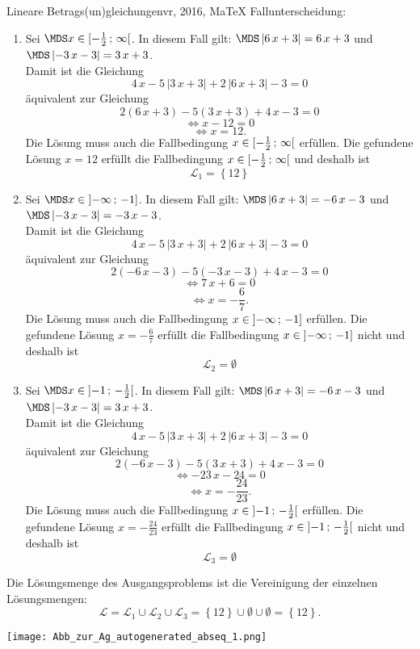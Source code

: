 \begin{MAufgabe}{Lineare Betrags(un)gleichungen}{vr, 2016, MaTeX}
 Fallunterscheidung: 

 \begin{enumerate} 
 \item Sei $ \MDS x\in[ - \frac{1}{2} \, \MIntvlSep \, \infty\MoIr $. 
 In diesem Fall gilt: 
  $ \MDS \left| 6\, x + 3\right|=6\, x + 3$ und $ \MDS \left|  - 3\, x - 3\right|=3\, x + 3$. \\ 
 Damit ist die Gleichung 
 $$ 
4\, x - 5\, \left|3\, x + 3\right| + 2\, \left|6\, x + 3\right| - 3= 0
$$
 \"aquivalent zur Gleichung
 $$ 
2\left(6\, x + 3\right)-5\left( 3\, x + 3\right)+4\, x-3= 0 
$$  
$$ 
 \Leftrightarrow x - 12= 0 
$$  
$$ \Leftrightarrow x = 12 . 
 $$ 
 Die L\"osung muss auch die Fallbedingung $x\in [ - \frac{1}{2} \, ; \, \infty[\mbox{}  $ erf\"ullen. Die gefundene L\"osung $x=12$ erf\"ullt die Fallbedingung  $x\in [ - \frac{1}{2} \, ; \, \infty[\mbox{} $ und deshalb ist  $$
 \mathcal{L}_{1}=\left\{12\right\}
 $$ 
\item Sei $ \MDS x\in\MoIl  -\infty \, \MIntvlSep \, -1]$. 
 In diesem Fall gilt: 
  $ \MDS \left| 6\, x + 3\right|= - 6\, x - 3$ und $ \MDS \left|  - 3\, x - 3\right|= - 3\, x - 3$. \\ 
 Damit ist die Gleichung 
 $$ 
4\, x - 5\, \left|3\, x + 3\right| + 2\, \left|6\, x + 3\right| - 3= 0
$$
 \"aquivalent zur Gleichung
 $$ 
2\left( - 6\, x - 3\right)-5\left(  - 3\, x - 3\right)+4\, x-3= 0 
$$  
$$ 
 \Leftrightarrow 7\, x + 6= 0 
$$  
$$ \Leftrightarrow x = - \frac{6}{7} . 
 $$ 
 Die L\"osung muss auch die Fallbedingung $x\in \mbox{}]\mathopen{}  -\infty \, ; \, -1] $ erf\"ullen. Die gefundene L\"osung $x=- \frac{6}{7}$ erf\"ullt die Fallbedingung  $x\in \mbox{}]\mathopen{}  -\infty \, ; \, -1]$ nicht und deshalb ist  $$
 \mathcal{L}_{2}=\emptyset 
 $$ 
\item Sei $ \MDS x\in\MoIl  -1 \, \MIntvlSep \, - \frac{1}{2}\MoIr $. 
 In diesem Fall gilt: 
  $ \MDS \left| 6\, x + 3\right|= - 6\, x - 3$ und $ \MDS \left|  - 3\, x - 3\right|=3\, x + 3$. \\ 
 Damit ist die Gleichung 
 $$ 
4\, x - 5\, \left|3\, x + 3\right| + 2\, \left|6\, x + 3\right| - 3= 0
$$
 \"aquivalent zur Gleichung
 $$ 
2\left( - 6\, x - 3\right)-5\left( 3\, x + 3\right)+4\, x-3= 0 
$$  
$$ 
 \Leftrightarrow  - 23\, x - 24= 0 
$$  
$$ \Leftrightarrow x = - \frac{24}{23} . 
 $$ 
 Die L\"osung muss auch die Fallbedingung $x\in \mbox{}]\mathopen{}  -1 \, ; \, - \frac{1}{2}[\mbox{}  $ erf\"ullen. Die gefundene L\"osung $x=- \frac{24}{23}$ erf\"ullt die Fallbedingung  $x\in \mbox{}]\mathopen{}  -1 \, ; \, - \frac{1}{2}[\mbox{} $ nicht und deshalb ist  $$
 \mathcal{L}_{3}=\emptyset 
 $$ 
 \end{enumerate} 
  Die L\"osungsmenge des Ausgangsproblems ist die Vereinigung der einzelnen L\"osungsmengen: 
$$ \mathcal{L} = \mathcal{L}_{1} \cup \mathcal{L}_{2} \cup \mathcal{L}_{3} 
 = \left\{12\right\}\cup \emptyset\cup \emptyset 
  =\left\{12\right\} 
   . $$ 
 
 \begin{center}
 \texttt{[image: Abb\_zur\_Ag\_autogenerated\_abseq\_1.png]} \end{center}
 
\else\relax\fi
 \end{MAufgabe}
